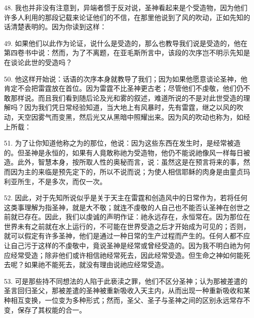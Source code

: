 48. 我也并非没有注意到，异端者惯于反对说，圣神看起来是个受造物，因为他们许多人利用的那段记载来论证他们的不信，在那里他说到了风的吹动，正如先知的话清楚表明的。因为你读到这样：\par

49. 如果他们以此作为论证，说什么是受造的，那么也教导我们说是受造的，他在第四卷书中说：然而，为了不离题，在亚毛斯所言中，该段的次序岂不明示先知是在谈论此世的受造吗？\par

50. 他这样开始说：话语的次序本身就教导了我们；因为如果他愿意谈论圣神，他肯定不会把雷霆放在首位。因为雷霆不比圣神更古老；尽管他们不虔敬，他们仍不敢那样说。而且我们看到随后论及光和雾的叙述，难道所说的不是对此世受造的理解吗？因为我们凭日常经验知道，当大地上有风暴时，先有雷霆，继之以风的吹动，天空因雾气而变黑，然后光又从黑暗中照耀出来。因为风的吹动也称为，如经上所载：\par

51. 为了让你知道他称之为的那位，他说：因为这些东西在发生时，是经常被造的。但圣神是永恒的，如果有人竟敢称祂为受造物，他仍不能说祂像风一样每日被造。此外，智慧本身，按所取人性的奥秘而言，说：虽然这是在预言将来的事，然而因为主的来临是预先定下的，所以不说而说；为使人相信耶稣的肉身是由童贞玛利亚所生，不是多次，而仅一次。\par

52. 因此，对于先知所说似乎是关于天主在雷霆和创造风中的日常作为，若将任何这类事理解为指圣神，就是大不敬；就连不虔敬的人自己也不能否认圣神在创世之前就已存在。因此，我们以虔诚的声明作证：祂永远存在，永恒常在。因为那位在世界未有之前就在水上运行的，不可能在世界受造之后才开始成为可见的；否则，就可以假定有许多圣神，他们是通过一种日常的生产过程而产生的。任何人都不应让自己污于这样的不虔敬中，竟说圣神是经常或曾经受造的。因为我不明白祂为何应经常受造；除非他们或许相信祂经常死去，因此经常受造。但生命之神如何能死去呢？如果祂不能死去，就没有理由说祂应经常受造。\par

53. 可是那些持不同想法的人陷于此亵渎之罪，他们不区分圣神；认为那被差遣的圣言回归圣父，那被差遣的圣神被重新吸收入天主内，从而出现一种重新吸收和某种相互变换，一位变为多种形式；然而，圣父、圣子与圣神之间的区别永远常存不变，保存了其权能的合一。\par

